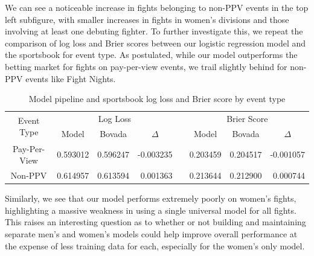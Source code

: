 \documentclass[12pt,twoside]{report}
\begin{document}
We can see a noticeable increase in fights belonging to non-PPV events in the top left subfigure, with smaller increases in fights in women's divisions and those involving at least one debuting fighter. To further investigate this, we repeat the comparison of log loss and Brier scores between our logistic regression model and the sportsbook for event type. As postulated, while our model outperforms the betting market for fights on pay-per-view events, we trail slightly behind for non-PPV events like Fight Nights.


\begin{table}[!htb]
\centering
\begin{tabular}{@{}cccrcccr@{}}
\toprule
\multirow{2}{*}{Event Type} & \multicolumn{3}{c}{Log Loss}                       & \multirow{2}{*}{} & \multicolumn{3}{c}{Brier Score}                    \\ \cmidrule(lr){2-4} \cmidrule(l){6-8} 
                        & Model    & Bovada   & \multicolumn{1}{c}{$\Delta$} &                   & Model    & Bovada   & \multicolumn{1}{c}{$\Delta$} \\ \midrule
Pay-Per-View            & 0.593012 & 0.596247 & -0.003235                    &                   & 0.203459 & 0.204517 & -0.001057                    \\
Non-PPV             & 0.614957 & 0.613594 & 0.001363                     &                   & 0.213644 & 0.212900 & 0.000744                     \\ \bottomrule
\end{tabular}
\caption{Model pipeline and sportsbook log loss and Brier score by event type}
\end{table}


Similarly, we see that our model performs extremely poorly on women's fights, highlighting a massive weakness in using a single universal model for all fights. This raises an interesting question as to whether or not building and maintaining separate men's and women's models could help improve overall performance at the expense of less training data for each, especially for the women's only model.
\end{document}
